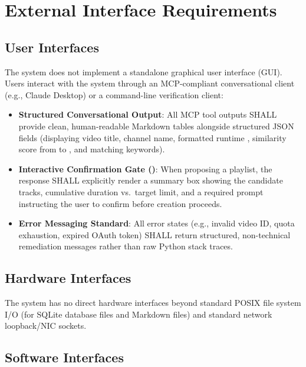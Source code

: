 \documentclass[11pt, a4paper]{article}
\newcommand{\filepath}[1]{\path{#1}}
\begin{document}
\section{External Interface Requirements}

\subsection{User Interfaces}
The system does not implement a standalone graphical user interface (GUI). Users interact with the system through an MCP-compliant conversational client (e.g., Claude Desktop) or a command-line verification client:
\begin{itemize}[noitemsep, topsep=2pt]
    \item \textbf{Structured Conversational Output}: All MCP tool outputs SHALL provide clean, human-readable Markdown tables alongside structured JSON fields (displaying video title, channel name, formatted runtime \filepath{MM:SS}, similarity score from \filepath{0.00} to \filepath{1.00}, and matching keywords).
    \item \textbf{Interactive Confirmation Gate (\filepath{FR-5})}: When proposing a playlist, the response SHALL explicitly render a summary box showing the candidate tracks, cumulative duration vs.\ target limit, and a required prompt instructing the user to confirm before creation proceeds.
    \item \textbf{Error Messaging Standard}: All error states (e.g., invalid video ID, quota exhaustion, expired OAuth token) SHALL return structured, non-technical remediation messages rather than raw Python stack traces.
\end{itemize}

\subsection{Hardware Interfaces}
The system has no direct hardware interfaces beyond standard POSIX file system I/O (for SQLite database files and \filepath{brain/} Markdown files) and standard network loopback/NIC sockets.

\subsection{Software Interfaces}
\end{document}
